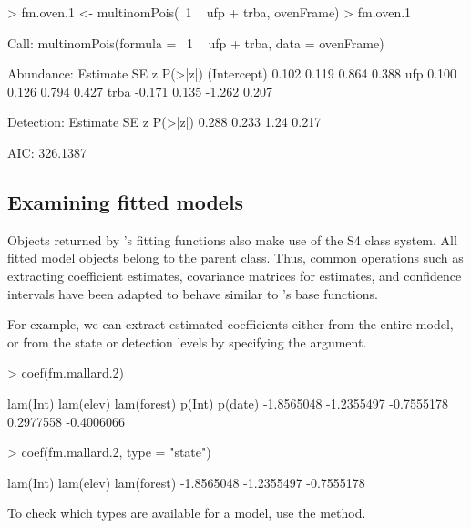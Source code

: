 \documentclass[article,shortnames]{jss}
\newcommand{\um}{\pkg{unmarked}}
\newcommand{\rlang}{\proglang{R}}
\begin{document}
{\begin{Schunk}
\begin{Sinput}
> fm.oven.1 <- multinomPois(~1 ~ ufp + trba, ovenFrame)
> fm.oven.1
\end{Sinput}
\begin{Soutput}
Call:
multinomPois(formula = ~1 ~ ufp + trba, data = ovenFrame)

Abundance:
            Estimate    SE      z P(>|z|)
(Intercept)    0.102 0.119  0.864   0.388
ufp            0.100 0.126  0.794   0.427
trba          -0.171 0.135 -1.262   0.207

Detection:
 Estimate    SE    z P(>|z|)
    0.288 0.233 1.24   0.217

AIC: 326.1387 
\end{Soutput}
\end{Schunk}


\subsection{Examining fitted models}
\label{sec:examining-model-fits}

Objects returned by \um's fitting functions also make use of the S4
class system.  All fitted model objects belong to the  
parent class.  Thus, common operations such as extracting coefficient
estimates, covariance matrices for estimates, and confidence intervals
have been adapted to behave similar to \rlang's base functions.

For example, we can extract estimated coefficients either from the
entire model, or from the state or detection levels by specifying the
 argument.

\begin{Schunk}
\begin{Sinput}
> coef(fm.mallard.2)
\end{Sinput}
\begin{Soutput}
   lam(Int)   lam(elev) lam(forest)      p(Int)     p(date) 
 -1.8565048  -1.2355497  -0.7555178   0.2977558  -0.4006066 
\end{Soutput}
\begin{Sinput}
> coef(fm.mallard.2, type = "state")
\end{Sinput}
\begin{Soutput}
   lam(Int)   lam(elev) lam(forest) 
 -1.8565048  -1.2355497  -0.7555178 
\end{Soutput}
\end{Schunk}

To check which types are available for a model, use the  method.

}
\end{document}
